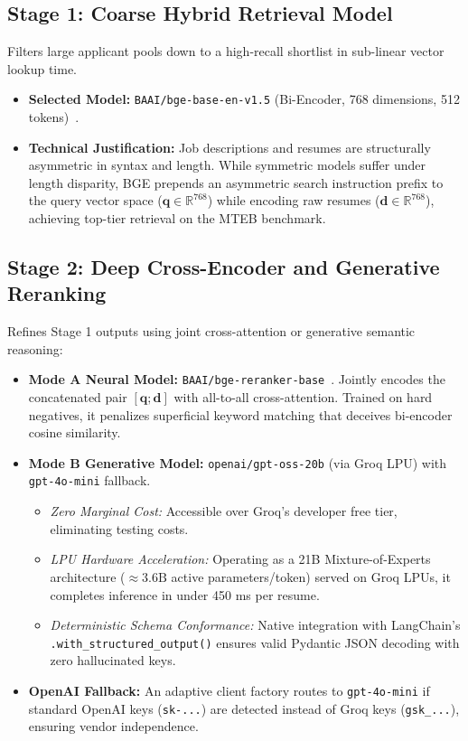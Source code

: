 \documentclass[12pt,a4paper]{article}
\begin{document}
\subsection{Stage 1: Coarse Hybrid Retrieval Model}
Filters large applicant pools down to a high-recall shortlist in sub-linear vector lookup time.
\begin{itemize}[topsep=1pt,itemsep=0pt,parsep=0pt]
    \item \textbf{Selected Model:} \texttt{BAAI/bge-base-en-v1.5} (Bi-Encoder, 768 dimensions, 512 tokens)~\cite{bge_models}.
    \item \textbf{Technical Justification:} Job descriptions and resumes are structurally asymmetric in syntax and length. While symmetric models suffer under length disparity, BGE prepends an asymmetric search instruction prefix to the query vector space ($\mathbf{q} \in \mathbb{R}^{768}$) while encoding raw resumes ($\mathbf{d} \in \mathbb{R}^{768}$), achieving top-tier retrieval on the MTEB benchmark.
\end{itemize}

\subsection{Stage 2: Deep Cross-Encoder and Generative Reranking}
Refines Stage 1 outputs using joint cross-attention or generative semantic reasoning:
\begin{itemize}[topsep=1pt,itemsep=0pt,parsep=0pt]
    \item \textbf{Mode A Neural Model:} \texttt{BAAI/bge-reranker-base}~\cite{bge_models}. Jointly encodes the concatenated pair $[\mathbf{q}; \mathbf{d}]$ with all-to-all cross-attention. Trained on hard negatives, it penalizes superficial keyword matching that deceives bi-encoder cosine similarity.
    \item \textbf{Mode B Generative Model:} \texttt{openai/gpt-oss-20b} (via Groq LPU) with \texttt{gpt-4o-mini} fallback.
    \begin{itemize}[topsep=0.5pt,itemsep=0pt,parsep=0pt]
        \item \textit{Zero Marginal Cost:} Accessible over Groq's developer free tier, eliminating testing costs.
        \item \textit{LPU Hardware Acceleration:} Operating as a 21B Mixture-of-Experts architecture ($\approx 3.6\text{B}$ active parameters/token) served on Groq LPUs, it completes inference in under 450 ms per resume.
        \item \textit{Deterministic Schema Conformance:} Native integration with LangChain's \texttt{.with\_\allowbreak structured\_\allowbreak output()} ensures valid Pydantic JSON decoding with zero hallucinated keys.
    \end{itemize}
    \item \textbf{OpenAI Fallback:} An adaptive client factory routes to \texttt{gpt-4o-mini} if standard OpenAI keys (\texttt{sk-...}) are detected instead of Groq keys (\texttt{gsk\_...}), ensuring vendor independence.
\end{itemize}
\end{document}
